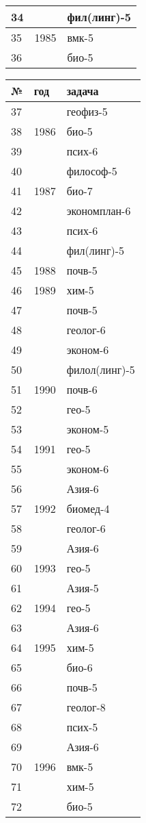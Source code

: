 \documentclass[12pt,a4paper]{report}
\begin{document}
\begin{center}
\begin{tabular}{|l|l|l|}
\hline
34&&фил(линг)-5\\
\hline
35&1985&вмк-5\\
\hline
36&&био-5\\
\hline
\end{tabular}
\begin{tabular}{|l|l|l|}
\hline
№&год&задача\\
\hline
37&&геофиз-5\\
\hline
38&1986&био-5\\
\hline
39&&псих-6\\
\hline
40&&философ-5\\
\hline
41&1987&био-7\\
\hline
42&&экономплан-6\\
\hline
43&&псих-6\\
\hline
44&&фил(линг)-5\\
\hline
45&1988&почв-5\\
\hline
46&1989&хим-5\\
\hline
47&&почв-5\\
\hline
48&&геолог-6\\
\hline
49&&эконом-6\\
\hline
50&&филол(линг)-5\\
\hline
51&1990&почв-6\\
\hline
52&&гео-5\\
\hline
53&&эконом-5\\
\hline
54&1991&гео-5\\
\hline
55&&эконом-6\\
\hline
56&&Азия-6\\
\hline
57&1992&биомед-4\\
\hline
58&&геолог-6\\
\hline
59&&Азия-6\\
\hline
60&1993&гео-5\\
\hline
61&&Азия-5\\
\hline
62&1994&гео-5\\
\hline
63&&Азия-6\\
\hline
64&1995&хим-5\\
\hline
65&&био-6\\
\hline
66&&почв-5\\
\hline
67&&геолог-8\\
\hline
68&&псих-5\\
\hline
69&&Азия-6\\
\hline
70&1996&вмк-5\\
\hline
71&&хим-5\\
\hline
72&&био-5\\

\end{tabular}
\end{center}
\end{document}
